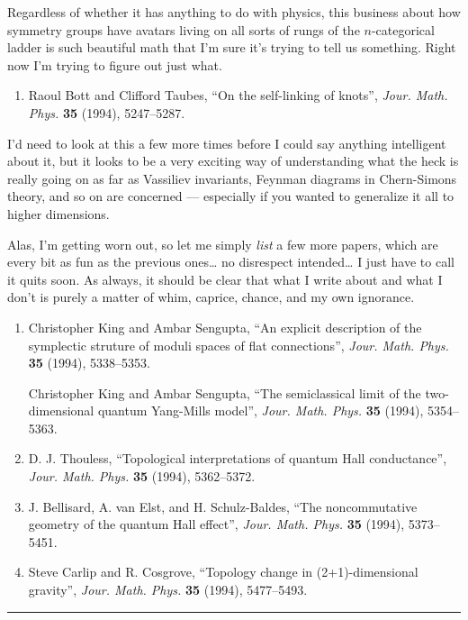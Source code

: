 \documentclass{article}
\def\tightlist{}
\begin{document}
Regardless of whether it has anything to do with physics, this business
about how symmetry groups have avatars living on all sorts of rungs of
the \(n\)-categorical ladder is such beautiful math that I'm sure it's
trying to tell us something. Right now I'm trying to figure out just
what.

\begin{enumerate}
\def\labelenumi{\arabic{enumi})}
\setcounter{enumi}{2}
\tightlist
\item
  Raoul Bott and Clifford Taubes, ``On the self-linking of knots'',
  \emph{Jour. Math. Phys.} \textbf{35} (1994), 5247--5287.
\end{enumerate}

I'd need to look at this a few more times before I could say anything
intelligent about it, but it looks to be a very exciting way of
understanding what the heck is really going on as far as Vassiliev
invariants, Feynman diagrams in Chern-Simons theory, and so on are
concerned --- especially if you wanted to generalize it all to higher
dimensions.

Alas, I'm getting worn out, so let me simply \emph{list} a few more
papers, which are every bit as fun as the previous ones\ldots{} no
disrespect intended\ldots{} I just have to call it quits soon. As
always, it should be clear that what I write about and what I don't is
purely a matter of whim, caprice, chance, and my own ignorance.

\begin{enumerate}
\def\labelenumi{\arabic{enumi})}
\setcounter{enumi}{3}
\item
  Christopher King and Ambar Sengupta, ``An explicit description of the
  symplectic struture of moduli spaces of flat connections'',
  \emph{Jour. Math. Phys.} \textbf{35} (1994), 5338--5353.

  Christopher King and Ambar Sengupta, ``The semiclassical limit of the
  two-dimensional quantum Yang-Mills model'', \emph{Jour. Math. Phys.}
  \textbf{35} (1994), 5354--5363.
\item
  D. J. Thouless, ``Topological interpretations of quantum Hall
  conductance'', \emph{Jour. Math. Phys.} \textbf{35} (1994),
  5362--5372.
\item
  J. Bellisard, A. van Elst, and H. Schulz-Baldes, ``The noncommutative
  geometry of the quantum Hall effect'', \emph{Jour. Math. Phys.}
  \textbf{35} (1994), 5373--5451.
\item
  Steve Carlip and R. Cosgrove, ``Topology change in (2+1)-dimensional
  gravity'', \emph{Jour. Math. Phys.} \textbf{35} (1994), 5477--5493.
\end{enumerate}

\begin{center}\rule{0.5\linewidth}{0.5pt}\end{center}
\end{document}
